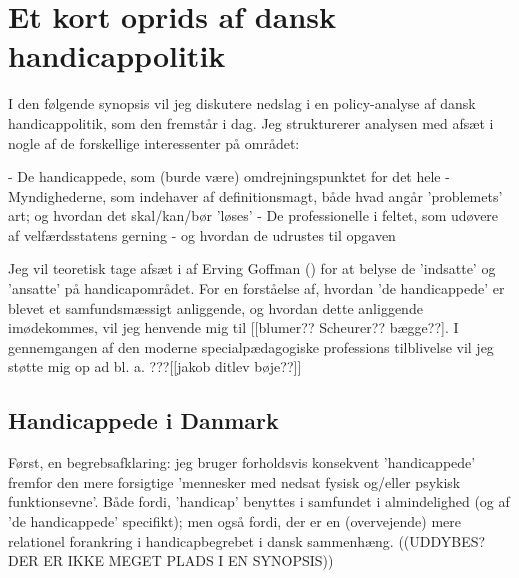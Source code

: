 \section{Et kort oprids af dansk handicappolitik}

I den følgende synopsis vil jeg diskutere nedslag i en policy-analyse af dansk handicappolitik, som den fremstår i dag.
Jeg strukturerer analysen med afsæt i nogle af de forskellige interessenter på området:

- De handicappede, som (burde være) omdrejningspunktet for det hele
- Myndighederne, som indehaver af definitionsmagt, både hvad angår 'problemets' art; og hvordan det skal/kan/bør 'løses'
- De professionelle i feltet, som udøvere af velfærdsstatens gerning - og hvordan de udrustes til opgaven

Jeg vil teoretisk tage afsæt i  af Erving Goffman (\citeyear{goffmanAsylumsEssaysSocial1991}) for at belyse de 'indsatte' og 'ansatte' på handicapområdet.
For en forståelse af, hvordan 'de handicappede' er blevet et samfundsmæssigt anliggende, og hvordan dette anliggende imødekommes, vil jeg henvende mig til [[blumer?? Scheurer?? bægge??].
I gennemgangen af den moderne specialpædagogiske professions tilblivelse vil jeg støtte mig op ad bl. a. ???[[jakob ditlev bøje??]]

\subsection{Handicappede i Danmark}
Først, en begrebsafklaring: jeg bruger forholdsvis konsekvent 'handicappede' fremfor den mere forsigtige 'mennesker med nedsat fysisk og/eller psykisk funktionsevne'.
Både fordi, 'handicap' benyttes i samfundet i almindelighed (og af 'de handicappede' specifikt); men også fordi, der er en (overvejende) mere relationel forankring i handicapbegrebet i dansk sammenhæng. ((UDDYBES? DER ER IKKE MEGET PLADS I EN SYNOPSIS))  

